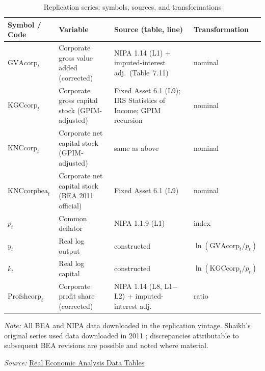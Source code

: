 \documentclass[11pt,a4paper]{article}
\begin{document}
\begin{table}[!ht]
	\centering
	\small
	\setlength{\tabcolsep}{3pt}
	\renewcommand{\arraystretch}{1.15}
	\caption{Replication series: symbols, sources, and transformations}
	\label{tab:app_glossary}
	\begin{tabular}{@{}>{\raggedright\arraybackslash}p{}
			>{\raggedright\arraybackslash}p{}
			>{\raggedright\arraybackslash}p{}
			>{\raggedright\arraybackslash}p{}@{}}
		\hline
		Symbol / Code & Variable & Source (table, line) & Transformation \\
		\hline
		$\text{GVAcorp}_t$ 
		& Corporate gross value added (corrected)
		& NIPA 1.14 (L1) + imputed-interest adj.\ (Table~7.11)
		& nominal \\[3pt]
		$\text{KGCcorp}_t$ 
		& Corporate gross capital stock (GPIM-adjusted)
		& Fixed Asset 6.1 (L9); IRS Statistics of Income; GPIM recursion
		& nominal \\[3pt]
		$\text{KNCcorp}_t$ 
		& Corporate net capital stock (GPIM-adjusted)
		& same as above
		& nominal \\[3pt]
		$\text{KNCcorpbea}_t$
		& Corporate net capital stock (BEA 2011 official)
		& Fixed Asset 6.1 (L9)
		& nominal \\[3pt]
		$p_t$ 
		& Common deflator
		& NIPA 1.1.9 (L1)
		& index \\[3pt]
		$y_t$
		& Real log output
		& constructed
		& $\ln(\text{GVAcorp}_t/p_t)$ \\[3pt]
		$k_t$
		& Real log capital
		& constructed
		& $\ln(\text{KGCcorp}_t/p_t)$ \\[3pt]
		$\text{Profshcorp}_t$ 
		& Corporate profit share (corrected)
		& NIPA 1.14 (L8, L1$-$L2) + imputed-interest adj.
		& ratio \\
		\hline
	\end{tabular}
	\par\vspace{0.4em}
	\footnotesize\textit{Note:} All BEA and NIPA data downloaded in the
	replication vintage. Shaikh's original series used data downloaded in
	2011 \citep[Appendix~6.7, fn.~1]{Shaikh2016}; discrepancies attributable
	to subsequent BEA revisions are possible and noted where material.
	\par\vspace{0.2em}
	\footnotesize\textit{Source:}
	\href{https://www.realecon.org/data}{Real Economic Analysis Data Tables}
\end{table}

\end{document}
